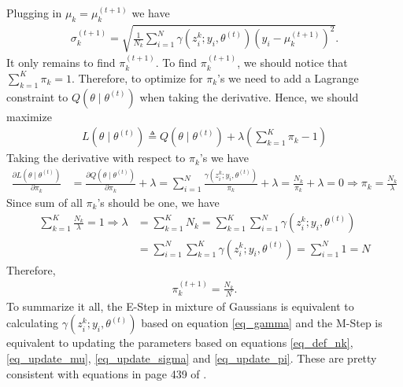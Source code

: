 \documentclass[10pt ]{article}
\begin{document}
Plugging in $\mu_k = \mu_k^{(t+1)}$ we have 
\begin{align}
\sigma_k^{(t+1)} =  \sqrt{\frac{1}{N_k} \sum_{i=1}^N  \gamma(z^k_i; y_i, \theta^{(t)})  (y_i - \mu_k^{(t+1)})^2}. 
\label{eq_update_sigma}
\end{align}
It only remains to find $\pi_k^{(t+1)}$.  To find $\pi_k^{(t+1)}$, we should notice that $\sum_{k=1}^K \pi_k = 1$. Therefore, to optimize for $\pi_k$'s we need to add a Lagrange constraint to $Q(\theta \mid \theta^{(t)})$ when taking the derivative. Hence, we should maximize
\begin{align}
 L(\theta \mid \theta^{(t)})  \triangleq Q(\theta \mid \theta^{(t)}) + \lambda \left(\sum_{k=1}^K \pi_k -1 \right) \nonumber
\end{align}
Taking the derivative with respect to $\pi_k$'s we have 
\begin{align}
\frac{\partial L(\theta \mid \theta^{(t)})}{\partial \pi_k} &= \frac{\partial Q(\theta \mid \theta^{(t)})}{\partial \pi_k} + \lambda = \sum_{i=1}^N  \frac{\gamma(z^k_i; y_i, \theta^{(t)} )}{\pi_k} + \lambda = \frac{N_k}{\pi_k} + \lambda = 0 \Rightarrow \pi_k = \frac{N_k}{\lambda} \nonumber 
\end{align}
Since sum of all $\pi_k$'s should be one, we have 
\begin{align}
\sum_{k=1}^K \frac{N_k}{\lambda} = 1  \Rightarrow \lambda &= \sum_{k=1}^K  N_k = \sum_{k=1}^K \sum_{i=1}^N \gamma(z^k_i; y_i, \theta^{(t)} ) \nonumber \\
&=  \sum_{i=1}^N  \sum_{k=1}^K \gamma(z^k_i; y_i, \theta^{(t)} ) = \sum_{i=1}^N 1 = N \nonumber 
\end{align}
Therefore, 
\begin{align}
\pi_k^{(t+1)} = \frac{N_k}{N}. 
\label{eq_update_pi}
\end{align}
To summarize it all, the E-Step in mixture of Gaussians is equivalent to calculating $\gamma(z^k_i; y_i, \theta^{(t)} )$ based on equation \eqref{eq_gamma} and the M-Step is equivalent to updating the parameters based on equations \eqref{eq_def_nk}, \eqref{eq_update_mu}, \eqref{eq_update_sigma} and  \eqref{eq_update_pi}. These are pretty consistent with equations in page 439 of \cite{bishop2006pattern}.



\end{document}
